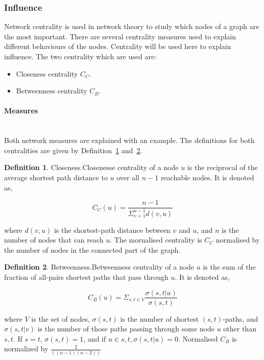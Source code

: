 \documentclass{article}
\theoremstyle{definition}
\newtheorem{definition}{Definition}[section]
\begin{document}
\subsubsection{Influence}

Network centrality is used in network theory to study which nodes of a graph are
the most important. There are several centrality measures used to explain different
behaviours of the nodes. Centrality will be used here to explain influence. 
The two centrality which are used are:

\begin{itemize}
    \item Closeness centrality \(C_C\).
    \item Betweenness centrality \(C_B\).
\end{itemize}

\paragraph{Measures}
\mbox{ }\\

Both network measures are explained with an example. The definitions for both
centralities are given by Definition~\ref{def:closeness} and~\ref{def:betweenness}.

\begin{definition}{Closeness.}\label{def:closeness}
    Closenesse centrality of a node \(u\) is the reciprocal of the average
    shortest path distance to \(u\) over all \(n-1\) reachable nodes. It is denoted as,
    
    \[C_C(u)= \frac{n - 1}{\displaystyle \Sigma_{v=1}^{n-1}d(v, u)}\]
    
    where \(d(v, u)\) is the shortest-path distance between \(v\) and \(u\), and \(n\)
    is the number of nodes that can reach \(u\). The mornalised centrality
    is \(C_C\) normalised by the number of nodes in the connected part of the
    graph.
\end{definition}

\begin{definition}{Betweenness.}\label{def:betweenness}
Betweenness centrality of a node \(u\) is the sum of the fraction of all-pairs
shortest paths that pass through \(u\). It is denoted as,

\[ C_B(u)=\Sigma_{s,t \in V} \frac{\sigma (s,t|u)}{\sigma(s,t)}\]

where \(V\) is the set of nodes, \(\sigma(s,t)\) is the number of shortest \((s,t)\)-paths,
and \(\sigma(s,t|v)\) is the number of those paths passing through some node
\(u\) other than \(s,t\). If \(s=t\), \(\sigma(s,t)=1\), and if \(u \in s,t, \sigma(s,t|u)=0\).
Normalised \(C_B\) is normalized by \(\frac{2}{((n-1)(n-2))}\)
\end{definition}
\end{document}

